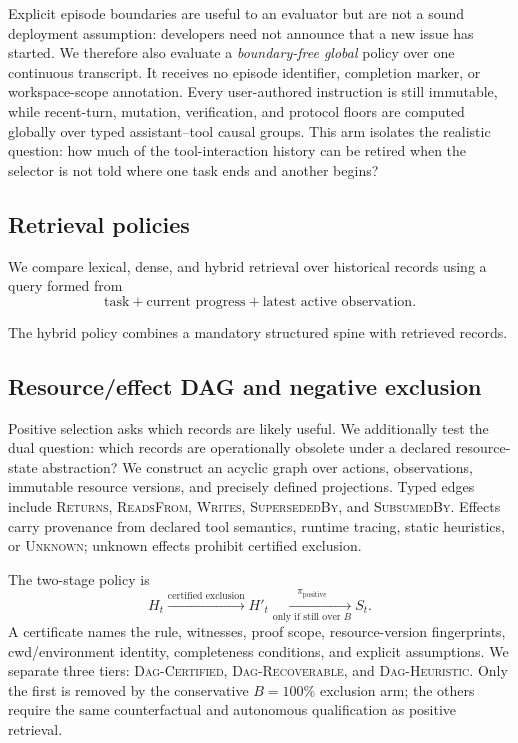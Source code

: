 \documentclass[11pt]{article}
\begin{document}
Explicit episode boundaries are useful to an evaluator but are not a sound
deployment assumption: developers need not announce that a new issue has
started.  We therefore also evaluate a \emph{boundary-free global} policy over
one continuous transcript.  It receives no episode identifier, completion
marker, or workspace-scope annotation.  Every user-authored instruction is
still immutable, while recent-turn, mutation, verification, and protocol
floors are computed globally over typed assistant--tool causal groups.  This
arm isolates the realistic question: how much of the tool-interaction history
can be retired when the selector is not told where one task ends and another
begins?

\subsection{Retrieval policies}

We compare lexical, dense, and hybrid retrieval over historical records using a
query formed from
\[
\text{task}
+
\text{current progress}
+
\text{latest active observation}.
\]

The hybrid policy combines a mandatory structured spine with retrieved records.

\subsection{Resource/effect DAG and negative exclusion}

Positive selection asks which records are likely useful. We additionally test
the dual question: which records are operationally obsolete under a declared
resource-state abstraction? We construct an acyclic graph over actions,
observations, immutable resource versions, and precisely defined projections.
Typed edges include \textsc{Returns}, \textsc{ReadsFrom}, \textsc{Writes},
\textsc{SupersededBy}, and \textsc{SubsumedBy}. Effects carry provenance from
declared tool semantics, runtime tracing, static heuristics, or \textsc{Unknown};
unknown effects prohibit certified exclusion.

The two-stage policy is
\[
H_t \xrightarrow{\text{certified exclusion}} H'_t
\xrightarrow[\text{only if still over }B]{\pi_{\mathrm{positive}}} S_t.
\]
A certificate names the rule, witnesses, proof scope, resource-version
fingerprints, cwd/environment identity, completeness conditions, and explicit
assumptions. We separate three tiers: \textsc{Dag-Certified},
\textsc{Dag-Recoverable}, and \textsc{Dag-Heuristic}. Only the first is removed
by the conservative $B=100\%$ exclusion arm; the others require the same
counterfactual and autonomous qualification as positive retrieval.
\end{document}
